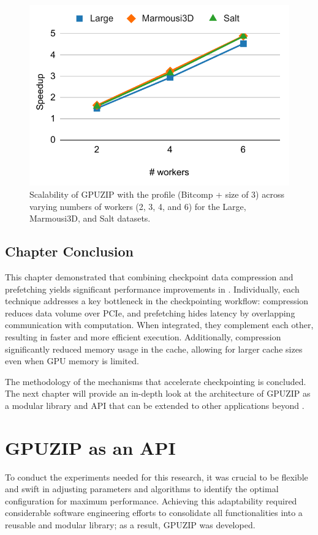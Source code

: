 \documentclass[Ingles,Final]{ic-tese-v3}
\begin{document}
\begin{figure}[h!]
    \centering
    \includegraphics[width=0.7\linewidth,trim={5 10 0 10},clip]{figures/scalability.pdf}
    \caption[Speedup scalability in MNMG (\checkpointprefetching + \compression)]{Scalability of GPUZIP with the \revolve profile (Bitcomp + \cache size of 3) across varying numbers of workers (2, 3, 4, and 6) for the Large, Marmousi3D, and Salt datasets.}
    \label{fig:scalability}
\end{figure}

\section{Chapter Conclusion}

This chapter demonstrated that combining checkpoint data compression and prefetching yields significant performance improvements in \awave. Individually, each technique addresses a key bottleneck in the checkpointing workflow: compression reduces data volume over PCIe, and prefetching hides latency by overlapping communication with computation. When integrated, they complement each other, resulting in faster and more efficient execution. Additionally, compression significantly reduced memory usage in the cache, allowing for larger cache sizes even when GPU memory is limited. 

The methodology of the mechanisms that accelerate checkpointing is concluded. The next chapter will provide an in-depth look at the architecture of GPUZIP as a modular library and API that can be extended to other applications beyond \awave.

\chapter{GPUZIP as an API}
\label{ch:oss}

To conduct the experiments needed for this research, it was crucial to be flexible and swift in adjusting \compression parameters and algorithms to identify the optimal configuration for maximum performance. Achieving this adaptability required considerable software engineering efforts to consolidate all functionalities into a reusable and modular library; as a result, GPUZIP was developed.
\end{document}
